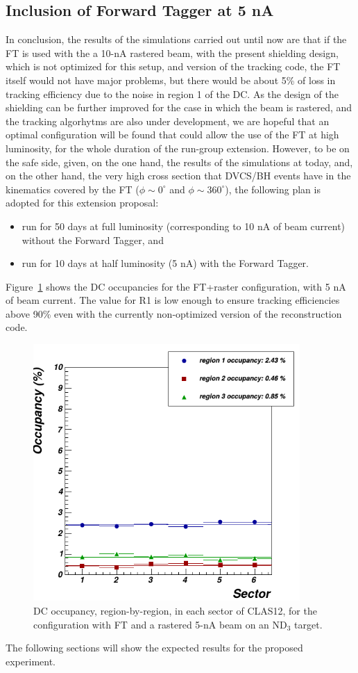 \subsection{Inclusion of Forward Tagger at 5 nA}
In conclusion, the results of the simulations carried out until now are that if the FT is used with the a 10-nA rastered beam, with the present shielding design, which is not optimized for this setup, and version of the tracking code, the FT itself would not have major problems, but there would be about 5\% of loss in tracking efficiency due to the noise in region 1 of the DC. As the design of the shielding can be further improved for the case in which the beam is rastered, and the tracking algorhytms are also under development, we are hopeful that an optimal configuration will be found that could allow the use of the FT at high luminosity, for the whole duration of the run-group extension. 
However, to be on the safe side, given, on the one hand, the results of the simulations at today, and, on the other hand, the very high cross section that DVCS/BH events have in the kinematics covered by the FT ($\phi\sim 0^{\circ}$ and $\phi\sim 360^{\circ}$), the following plan is adopted for this extension proposal:
\begin{itemize}
\item{run for 50 days at full luminosity (corresponding to 10 nA of beam current) without the Forward Tagger, and}
\item{run for 10 days at half luminosity (5 nA) with the Forward Tagger.}
\end{itemize}
Figure~\ref{dc_occ_5nA} shows the DC occupancies for the FT+raster configuration, with 5 nA of beam current. The value for R1 is low enough to ensure tracking efficiencies above 90\% even with the currently non-optimized version of the reconstruction code. 
\begin{figure}[htbp] 
   \centering
   \includegraphics[width=4in]{dc_occ_5nA_FT_detail.png} 
   \caption{DC occupancy, region-by-region, in each sector of CLAS12, for the configuration with FT and a rastered 5-nA beam on an ND$_3$ target.}
   \label{dc_occ_5nA}
\end{figure}
 The following sections will show the expected results for the proposed experiment. 

 

